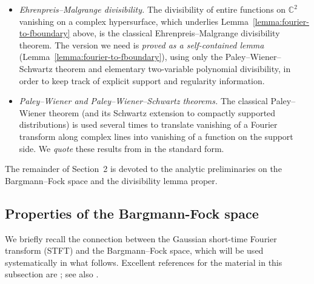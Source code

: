 \documentclass[a4paper,11pt,reqno]{amsart}
\numberwithin{equation}{section}
\theoremstyle{plain} %
\theoremstyle{definition} %
\theoremstyle{remark}
\newcommand{\C}{\mathbb{C}}
\begin{document}
\begin{itemize}
\item \emph{Ehrenpreis--Malgrange divisibility.} The divisibility of
entire functions on $\C^2$ vanishing on a complex hypersurface, which
underlies Lemma~\ref{lemma:fourier-to-fboundary} above, is the classical
Ehrenpreis--Malgrange divisibility theorem. The version we need is
\emph{proved as a self-contained lemma} (Lemma~\ref{lemma:fourier-to-fboundary}),
using only the Paley--Wiener--Schwartz theorem and elementary
two-variable polynomial divisibility, in order to keep track of explicit
support and regularity information.

\item \emph{Paley--Wiener and Paley--Wiener--Schwartz theorems.} The
classical Paley--Wiener theorem (and its Schwartz extension to compactly
supported distributions) is used several times to translate vanishing of
a Fourier transform along complex lines into vanishing of a function on
the support side. We \emph{quote} these results from
\cite{Hormander,Folland} in the standard form.
\end{itemize}

The remainder of Section~2 is devoted to the analytic preliminaries on
the Bargmann--Fock space and the divisibility lemma proper.

\subsection{Properties of the Bargmann-Fock space} We briefly recall the connection between the Gaussian short-time Fourier transform
(STFT) and the Bargmann--Fock space, which will be used systematically in what
follows. Excellent references for the material in this subsection are
\cite{Bargmann,Folland,Grochenig,Zhu}; see also
\cite{Berezin,Berger-Coburn,Daubechies}.

\medskip
\end{document}
